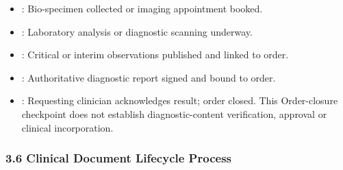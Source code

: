 \begin{itemize}
\begin{itemize}
\item
\texttt{}: Bio-specimen collected or imaging appointment booked.



\item
\texttt{}: Laboratory analysis or diagnostic scanning underway.



\item
\texttt{}: Critical or interim observations published and linked to order.



\item
\texttt{}: Authoritative diagnostic report signed and bound to order.



\item
\texttt{}: Requesting clinician acknowledges result; order closed. This Order-closure checkpoint does not establish diagnostic-content verification, approval or clinical incorporation.



\end{itemize}


\end{itemize}
\label{rad:processes:150}

\par\smallskip
{}\label{rad:processes:152}
\subsubsection*{3.6 Clinical Document Lifecycle Process}
\label{rad:processes:153}

